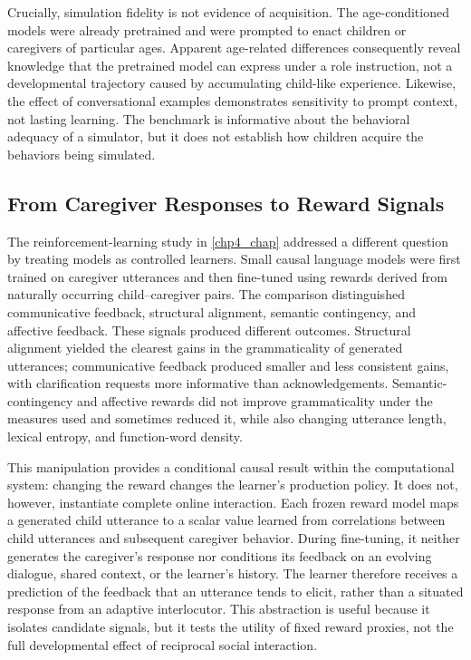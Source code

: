 Crucially, simulation fidelity is not evidence of acquisition. The age-conditioned models were already pretrained and were prompted to enact children or caregivers of particular ages. Apparent age-related differences consequently reveal knowledge that the pretrained model can express under a role instruction, not a developmental trajectory caused by accumulating child-like experience. Likewise, the effect of conversational examples demonstrates sensitivity to prompt context, not lasting learning. The benchmark is informative about the behavioral adequacy of a simulator, but it does not establish how children acquire the behaviors being simulated.

\subsection{From Caregiver Responses to Reward Signals}

The reinforcement-learning study in \cref{chp4_chap} addressed a different question by treating models as controlled learners. Small causal language models were first trained on caregiver utterances and then fine-tuned using rewards derived from naturally occurring child--caregiver pairs. The comparison distinguished communicative feedback, structural alignment, semantic contingency, and affective feedback. These signals produced different outcomes. Structural alignment yielded the clearest gains in the grammaticality of generated utterances; communicative feedback produced smaller and less consistent gains, with clarification requests more informative than acknowledgements. Semantic-contingency and affective rewards did not improve grammaticality under the measures used and sometimes reduced it, while also changing utterance length, lexical entropy, and function-word density.

This manipulation provides a conditional causal result within the computational system: changing the reward changes the learner's production policy. It does not, however, instantiate complete online interaction. Each frozen reward model maps a generated child utterance to a scalar value learned from correlations between child utterances and subsequent caregiver behavior. During fine-tuning, it neither generates the caregiver's response nor conditions its feedback on an evolving dialogue, shared context, or the learner's history. The learner therefore receives a prediction of the feedback that an utterance tends to elicit, rather than a situated response from an adaptive interlocutor. This abstraction is useful because it isolates candidate signals, but it tests the utility of fixed reward proxies, not the full developmental effect of reciprocal social interaction.

